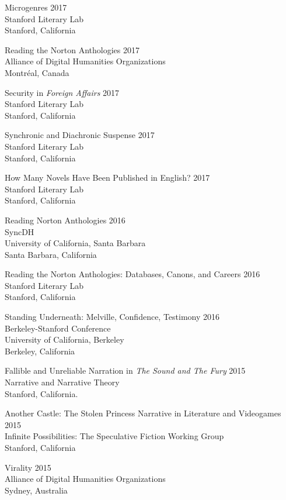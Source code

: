 \documentclass[
  12pt,
  letterpaper,
]{article}
\begin{document}
Microgenres \hfill 2017\\
Stanford Literary Lab\\
Stanford, California

Reading the Norton Anthologies \hfill 2017\\
Alliance of Digital Humanities Organizations\\
Montréal, Canada

Security in \emph{Foreign Affairs} \hfill 2017\\
Stanford Literary Lab\\
Stanford, California

Synchronic and Diachronic Suspense \hfill 2017\\
Stanford Literary Lab\\
Stanford, California

How Many Novels Have Been Published in English? \hfill 2017\\
Stanford Literary Lab\\
Stanford, California

Reading Norton Anthologies \hfill 2016\\
SyncDH\\
University of California, Santa Barbara\\
Santa Barbara, California

Reading the Norton Anthologies: Databases, Canons, and Careers \hfill 2016\\
Stanford Literary Lab\\
Stanford, California

Standing Underneath: Melville, Confidence, Testimony \hfill 2016\\
Berkeley-Stanford Conference\\
University of California, Berkeley\\
Berkeley, California

Fallible and Unreliable Narration in \emph{The Sound and The Fury} \hfill 2015\\
Narrative and Narrative Theory\\
Stanford, California.

Another Castle: The Stolen Princess Narrative in Literature and Videogames \hfill 2015\\
Infinite Possibilities: The Speculative Fiction Working Group\\
Stanford, California

Virality \hfill 2015\\
Alliance of Digital Humanities Organizations\\
Sydney, Australia
\end{document}
